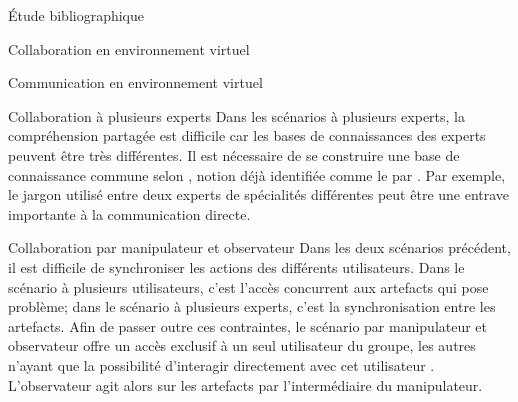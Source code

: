 \documentclass[myfrancais,ngerman,english,frenchb]{mythesis}
\begin{document}
\begin{mychapter}{Étude bibliographique}
\begin{mysection}{Collaboration en environnement virtuel}
\begin{mysubsection}{Communication en environnement virtuel}
\begin{mysubsubsection}{Collaboration à plusieurs experts}
					Dans les scénarios à plusieurs experts, la compréhension partagée est difficile car les bases de connaissances des experts peuvent être très différentes.
					Il est nécessaire de se construire une base de connaissance commune selon , notion déjà identifiée comme le  par  .
					Par exemple, le jargon utilisé entre deux experts de spécialités différentes peut être une entrave importante à la communication directe.
				\end{mysubsubsection}
				\begin{mysubsubsection}{Collaboration par manipulateur et observateur}
					Dans les deux scénarios précédent, il est difficile de synchroniser les actions des différents utilisateurs.
					Dans le scénario à plusieurs utilisateurs, c'est l'accès concurrent aux artefacts qui pose problème; dans le scénario à plusieurs experts, c'est la synchronisation entre les artefacts.
					Afin de passer outre ces contraintes, le scénario par manipulateur et observateur offre un accès exclusif à un seul utilisateur du groupe, les autres n'ayant que la possibilité d'interagir directement avec cet utilisateur .
					L'observateur agit alors sur les artefacts par l'intermédiaire du manipulateur.


\end{mysubsubsection}
\end{mysubsection}
\end{mysection}
\end{mychapter}
\end{document}
